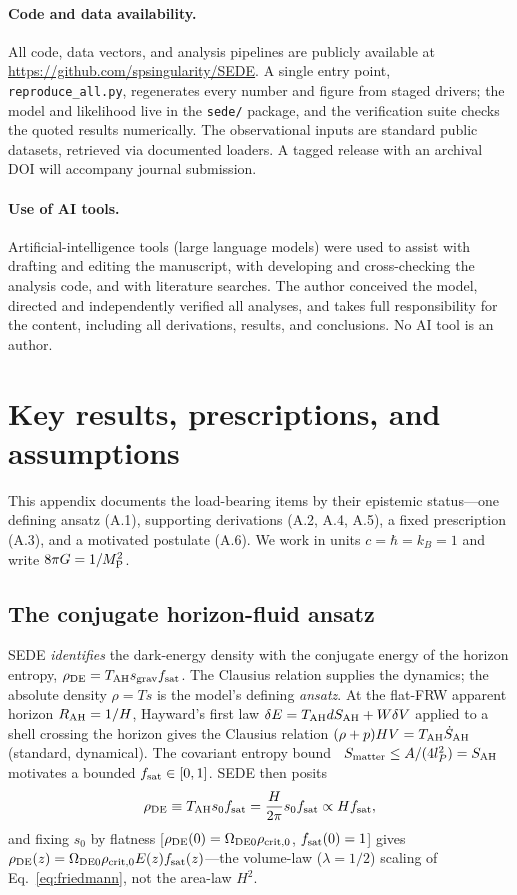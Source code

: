 \paragraph*{Code and data availability.} All code, data vectors, and analysis pipelines are publicly
available at \url{https://github.com/spsingularity/SEDE}. A single entry point, \texttt{reproduce\_all.py},
regenerates every number and figure from staged drivers; the model and likelihood live in the
\texttt{sede/} package, and the verification suite checks the quoted results numerically. The
observational inputs are standard public datasets, retrieved via documented loaders. A tagged release
with an archival DOI will accompany journal submission.

\paragraph*{Use of AI tools.} Artificial-intelligence tools (large language models) were used to assist
with drafting and editing the manuscript, with developing and cross-checking the analysis code, and with
literature searches. The author conceived the model, directed and independently verified all analyses,
and takes full responsibility for the content, including all derivations, results, and conclusions. No
AI tool is an author.

\appendix

\section{Key results, prescriptions, and assumptions}\label{app:results}
This appendix documents the load-bearing items by their epistemic status---one defining ansatz (A.1),
supporting derivations (A.2, A.4, A.5), a fixed prescription (A.3), and a motivated postulate (A.6). We
work in units $c=\hbar=k_B=1$ and write $8\pi G=1/M_{\mathrm P}^2$.

\subsection{The conjugate horizon-fluid ansatz}
SEDE \emph{identifies} the dark-energy density with the conjugate energy of the horizon entropy,
$\rho_{\mathrm{DE}}=T_{\mathrm{AH}}s_{\mathrm{grav}}f_{\mathrm{sat}}$. The Clausius relation supplies the dynamics; the absolute density $\rho=Ts$ is
the model's defining \emph{ansatz}. At the flat-FRW apparent horizon $R_{\mathrm{AH}}=1/H$, Hayward's first law
$\delta E=T_{\mathrm{AH}} dS_{\rm AH}+W\delta V$ applied to a shell crossing the horizon gives the Clausius
relation $(\rho+p)HV=T_{\mathrm{AH}}\dot S_{\rm AH}$ (standard, dynamical). The covariant entropy
bound~\cite{Bousso:2002ju} $S_{\rm matter}\le A/(4l_P^2)=S_{\rm AH}$ motivates a bounded $f_{\mathrm{sat}}\in[0,1]$.
SEDE then posits
\begin{equation}
\rho_{\mathrm{DE}}\equiv T_{\mathrm{AH}} s_0f_{\mathrm{sat}}=\frac{H}{2\pi}s_0f_{\mathrm{sat}}\propto Hf_{\mathrm{sat}},
\end{equation}
and fixing $s_0$ by flatness [$\rho_{\mathrm{DE}}(0)=\Omega_{\mathrm{DE0}}\rho_{\rm crit,0}$, $f_{\mathrm{sat}}(0)=1$] gives
$\rho_{\mathrm{DE}}(z)=\Omega_{\mathrm{DE0}}\rho_{\rm crit,0}E(z)f_{\mathrm{sat}}(z)$---the volume-law ($\lambda=1/2$) scaling of
Eq.~\eqref{eq:friedmann}, not the area-law $H^2$.

